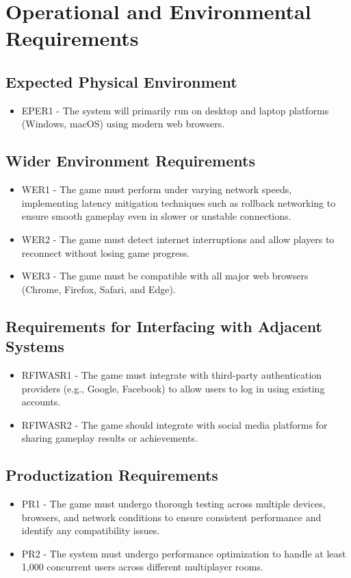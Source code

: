 \documentclass[12pt]{article}
\begin{document}
\section{Operational and Environmental Requirements}

\subsection{Expected Physical Environment}
\begin{itemize}
    \item EPER1 - The system will primarily run on desktop and laptop platforms (Windows, macOS) using modern web browsers.
\end{itemize}

\subsection{Wider Environment Requirements}
\begin{itemize}
    \item WER1 - The game must perform under varying network speeds, implementing latency mitigation techniques such as rollback networking to ensure smooth gameplay even in slower or unstable connections.
    \item WER2 - The game must detect internet interruptions and allow players to reconnect without losing game progress.
    \item WER3 - The game must be compatible with all major web browsers (Chrome, Firefox, Safari, and Edge).
\end{itemize}

\subsection{Requirements for Interfacing with Adjacent Systems}
\begin{itemize}
    \item RFIWASR1 - The game must integrate with third-party authentication providers (e.g., Google, Facebook) to allow users to log in using existing accounts.
    \item RFIWASR2 - The game should integrate with social media platforms for sharing gameplay results or achievements.
\end{itemize}

\subsection{Productization Requirements}
\begin{itemize}
    \item PR1 - The game must undergo thorough testing across multiple devices, browsers, and network conditions to ensure consistent performance and identify any compatibility issues.
    \item PR2 - The system must undergo performance optimization to handle at least 1,000 concurrent users across different multiplayer rooms.
\end{itemize}
\end{document}
